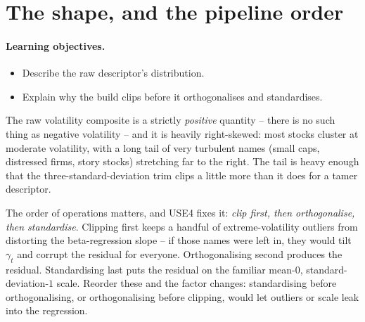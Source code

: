 \documentclass[11pt]{article}
\theoremstyle{definition}
\theoremstyle{plain}
\theoremstyle{remark}
\begin{document}
\section{The shape, and the pipeline order}\label{sec:shape}

\paragraph{Learning objectives.}
\begin{itemize}[leftmargin=1.4em,topsep=2pt]
  \item Describe the raw descriptor's distribution.
  \item Explain why the build clips before it orthogonalises and standardises.
\end{itemize}

The raw volatility composite is a strictly \emph{positive} quantity -- there is no such thing as negative volatility -- and it is heavily right-skewed: most stocks cluster at moderate volatility, with a long tail of very turbulent names (small caps, distressed firms, story stocks) stretching far to the right. The tail is heavy enough that the three-standard-deviation trim clips a little more than it does for a tamer descriptor.

The order of operations matters, and USE4 fixes it: \emph{clip first, then orthogonalise, then standardise}. Clipping first keeps a handful of extreme-volatility outliers from distorting the beta-regression slope -- if those names were left in, they would tilt $\gamma_t$ and corrupt the residual for everyone. Orthogonalising second produces the residual. Standardising last puts the residual on the familiar mean-$0$, standard-deviation-$1$ scale. Reorder these and the factor changes: standardising before orthogonalising, or orthogonalising before clipping, would let outliers or scale leak into the regression.
\end{document}
